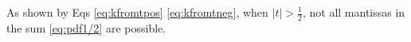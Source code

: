 \documentclass[10pt,a4paper]{article}
\theoremstyle{plain}
\theoremstyle{definition}
\newcommand{\F}[1][n,p]{\mathbb{F}_{#1}}
\newcommand{\R}{\mathbb{R}}
\newcommand{\eR}{\overline{\R}}
\newcommand{\Rep}[1][n,p]{\mathrm{i}_{#1}}
\newcommand{\Round}[1][n,p]{\mathrm{r}_{#1}}
\newcommand{\inv}{^{-1}}
\newcommand{\absv}[1]{\vert #1\vert}
\newcommand{\uro}[1][p]{u_{#1}}
\begin{document}
As shown by Eqs \eqref{eq:kfromtpos} \eqref{eq:kfromtneg}, when $\absv{t}>\frac{1}{2}$, not all mantissas in the sum \eqref{eq:pdf1/2} are possible.
\end{document}
